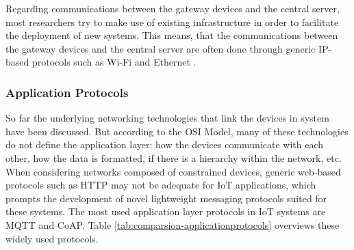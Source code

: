 Regarding communications between the gateway devices and the central server, most researchers try to make use of existing infrastructure in order to facilitate the deployment of new systems. This means, that the communications between the gateway devices and the central server are often done through generic IP-based protocols such as Wi-Fi and Ethernet \cite{Adame2018, Fuhrer2006, Wu2020, Catarinucci2015}. \bigskip

\subsubsection{Application Protocols}

So far the underlying networking technologies that link the devices in system have been discussed. But according to the OSI Model, many of these technologies do not define the application layer: how the devices communicate with each other, how the data is formatted, if there is a hierarchy within the network, etc. When considering networks composed of constrained devices, generic web-based protocols such as \acf{HTTP} may not be adequate for \acs{IoT} applications, which prompts the development of novel lightweight messaging protocols suited for these systems. The most used application layer protocols in \acs{IoT} systems are \acf{MQTT} and \acf{CoAP}. Table \ref{tab:comparsion-applicationprotocols} overviews these widely used protocols. \bigskip

